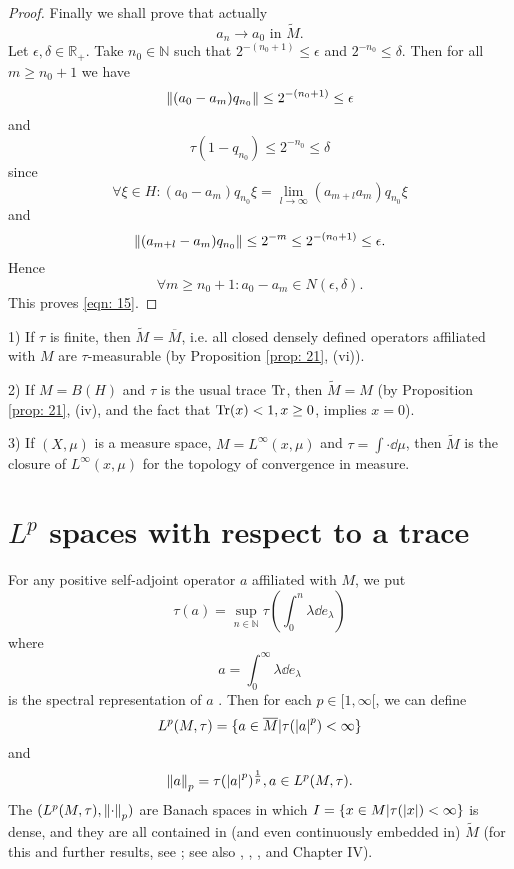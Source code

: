 \begin{proof}
    Finally we shall prove that actually
    \begin{equation}
        a_n\to a_0 \text{ in }\widetilde{M}.
    \end{equation}\label{eqn: 15}
    Let $\epsilon,\delta\in \mathbb{R}_+$. Take $n_0\in \mathbb{N}$ such that $2^{-(n_0+1)}\leq \epsilon$ and $2^{-n_0}\leq \delta$. Then for all $m\geq n_0+1$ we have
    \[
        \norm{(a_0-a_m)q_{n_0}}\leq 2^{-(n_0+1)}\leq \epsilon
    \]
    and
    \[
        \tau(1-q_{n_0})\leq 2^{-n_0}\leq \delta
    \]
    since
    \[
        \forall \xi\in H:(a_0-a_m)q_{n_0}\xi=\lim_{l\to\infty}(a_{m+l}a_m)q_{n_0}\xi
    \]
    and
    \[
        \norm{(a_{m+l}-a_m)q_{n_0}}\leq 2^{-m}\leq 2^{-(n_0+1)}\leq \epsilon.
    \]
    Hence
    \[
        \forall m\geq n_0+1:a_0-a_m\in N(\epsilon,\delta).
    \]
    This proves \eqref{eqn: 15}.
\end{proof}
\begin{example}
    1) If $\tau$ is finite, then $\widetilde{M}=\overline{M}$, i.e. all closed densely defined operators affiliated with $M$ are $\tau$-measurable (by Proposition \ref{prop: 21}, (vi)).\par
    2) If $M=B(H)$ and $\tau$ is the usual trace $\Tr$, then $\widetilde{M}=M$ (by Proposition \ref{prop: 21}, (iv), and the fact that $\Tr(x) < 1, x\geq 0$, implies $x = 0$).\par
    3) If $(X,\mu)$ is a measure space, $M = L^\infty(x,\mu)$ and $\tau=\int\cdot \dd \mu$, then $\widetilde{M}$ is the closure of $L^\infty(x,\mu)$ for the topology of convergence in measure.
\end{example}
\section{$L^p$ spaces with respect to a trace}
For any positive self-adjoint operator $a$ affiliated with $M$, we put
\[
    \tau(a)=\sup_{n\in \mathbb{N}}\tau\left( \int_0^n \lambda\dd e_\lambda \right)
\]
where
\[
    a=\int_0^\infty \lambda  \dd e_\lambda
\]
is the spectral representation of $a$ . Then for each $p\in [1,\infty[$, we can define
\[
    L^p(M,\tau)=\{a\in \overline{M}|\tau(\abs{a}^p)<\infty\}
\]
and
\[
    \norm{a}_p=\tau(\abs{a}^p)^\frac{1}{p},a\in L^p(M,\tau).
\]
The $(L^p(M,\tau),\norm{\cdot}_p)$ are Banach spaces in which $I=\{x\in M|\tau(\abs{x})<\infty\}$ is dense, and they are all contained in (and even continuously embedded in) $\widetilde{M}$ (for this and further results, see \cite{13}; see also \cite{3}, \cite{12}, \cite{21}, and Chapter IV).

